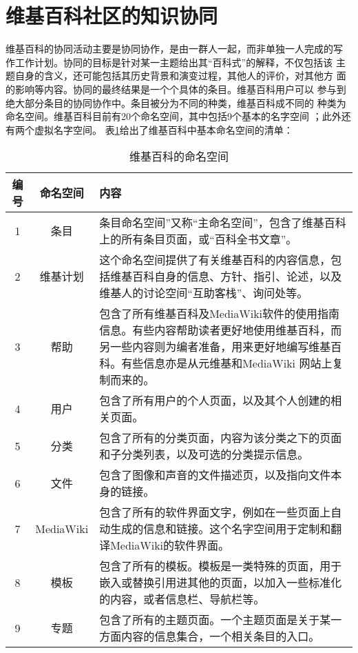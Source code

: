 \section{维基百科社区的知识协同}
维基百科的协同活动主要是协同协作，是由一群人一起，而非单独一人完成的写
作工作计划。协同的目标是针对某一主题给出其“百科式”的解释，不仅包括该
主题自身的含义，还可能包括其历史背景和演变过程，其他人的评价，对其他方
面的影响等内容。协同的最终结果是一个个具体的条目。维基百科用户可以
参与到绝大部分条目的协同协作中。条目被分为不同的种类，维基百科成不同的
种类为命名空间。维基百科目前有20个命名空间，其中包括9个基本的名字空间
；此外还有两个虚拟名字空间。
表\ref{tab:namespace}给出了维基百科中基本命名空间的清单：

\begin{table}[!htp]
\caption{维基百科的命名空间}
\label{tab:namespace}
  \begin{tabularx}{14cm}{|c|c|X|}
    \hline
    编号  & 命名空间  & 内容 \\
    \hline
    1 & 条目&条目命名空间”又称“主命名空间”，包含了维基百科上的所有条目页面，或“百科全书文章”。 \\\hline 
    2 &维基计划 & 这个命名空间提供了有关维基百科的内容信息，包括维基百科自身的信息、方针、指引、论述，以及维基人的讨论空间“互助客栈”、询问处等。\\\hline
    3 & 帮助 & 包含了所有维基百科及MediaWiki软件的使用指南信息。有些内容帮助读者更好地使用维基百科，而另一些内容则为编者准备，用来更好地编写维基百科。有些信息亦是从元维基和MediaWiki 网站上复制而来的。\\\hline
    4 &  用户  &包含了所有用户的个人页面，以及其个人创建的相关页面。 \\\hline
    5 & 分类 &包含了所有的分类页面，内容为该分类之下的页面和子分类列表，以及可选的分类提示信息。 \\\hline
    6 & 文件  &包含了图像和声音的文件描述页，以及指向文件本身的链接。 \\\hline
    7 & MediaWiki & 包含了所有的软件界面文字，例如在一些页面上自动生成的信息和链接。这个名字空间用于定制和翻译MediaWiki的软件界面。\\\hline
    8 &  模板 & 包含了所有的模板。模板是一类特殊的页面，用于嵌入或替换引用进其他的页面，以加入一些标准化的内容，或者信息栏、导航栏等。\\\hline
    9 & 专题 &包含了所有的主题页面。一个主题页面是关于某一方面内容的信息集合，一个相关条目的入口。 \\\hline
    \end{tabularx}
\end{table}

